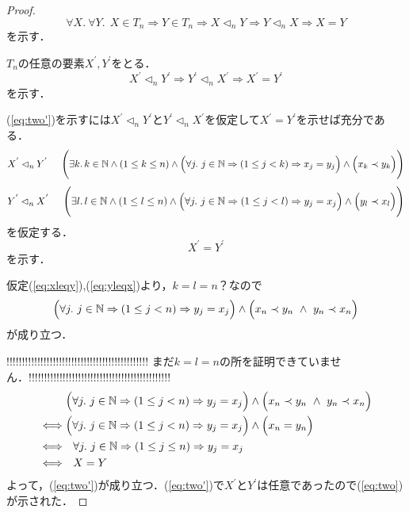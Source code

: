 \documentclass[11pt,dvipdfmx]{jarticle}
\theoremstyle{definition}
\begin{document}
\begin{proof}
\begin{equation}
\forall X. \ \forall Y. \ \ X \in T_{n} \Rightarrow Y \in T_{n} \Rightarrow X \lhd_{n} Y \Rightarrow Y \lhd_{n} X \Rightarrow X = Y
 \label{eq:two}
\end{equation}
を示す．\par
\noindent $T_{n}$の任意の要素$X^{'},Y^{'}$をとる．
\begin{equation}
X^{'} \lhd_{n} Y^{'} \Rightarrow Y^{'} \lhd_{n} X^{'} \Rightarrow X^{'} = Y^{'}
 \label{eq:two'}
\end{equation}
を示す．\par
\noindent (\ref{eq:two'})を示すには$X^{'} \lhd_{n} Y^{'}$と$Y^{'} \lhd_{n} X^{'}$を仮定して$X^{'} = Y^{'}$を示せば充分である．
\begin{equation}
 X^{'} \lhd_{n} Y^{'} \hspace{5mm} \Biggl( \exists k. \, k \in \mathbb{N} \land (1 \leq k \leq n) \land \Bigl( \forall j. \ j \in \mathbb{N} \Rightarrow (1 \leq j < k) \Rightarrow  x_{j} = y_{j} \Bigr) \land \Bigl( x_{k} \prec y_{k} \Bigr) \Biggr)
 \label{eq:xleqy}
\end{equation}
\begin{equation}
 Y^{'} \lhd_{n} X^{'} \hspace{5mm} \Biggl( \exists l. \, l \in \mathbb{N} \land (1 \leq l \leq n) \land \Bigl( \forall j. \ j \in \mathbb{N} \Rightarrow (1 \leq j < l) \Rightarrow  y_{j} = x_{j} \Bigr) \land \Bigl( y_{l} \prec x_{l} \Bigr) \Biggr)
 \label{eq:yleqx} 
\end{equation}
を仮定する．
\begin{equation}
 X^{'} = Y^{'}
\end{equation}
を示す． \par
\noindent 仮定(\ref{eq:xleqy}),(\ref{eq:yleqx})より，$k = l = n$？なので
\begin{equation}
\Bigl( \forall j. \ j \in \mathbb{N} \Rightarrow (1 \leq j < n) \Rightarrow  y_{j} = x_{j} \Bigr) \land \Bigl( x_{n} \prec y_{n} \ \land \ y_{n} \prec x_{n} \Bigr)
\end{equation}
が成り立つ．\par
\noindent !!!!!!!!!!!!!!!!!!!!!!!!!!!!!!!!!!!!!!!!!!!!!! まだ$k = l = n$の所を証明できていません．!!!!!!!!!!!!!!!!!!!!!!!!!!!!!!!!!!!!!!!!!!!!!! 
\begin{align*}
 & \Bigl( \forall j. \ j \in \mathbb{N} \Rightarrow (1 \leq j < n) \Rightarrow  y_{j} = x_{j} \Bigr) \land \Bigl( x_{n} \prec y_{n} \ \land \ y_{n} \prec x_{n} \Bigr) \\
\iff & \Bigl( \forall j. \ j \in \mathbb{N} \Rightarrow (1 \leq j < n) \Rightarrow  y_{j} = x_{j} \Bigr) \land \Bigl( x_{n} = y_{n} \Bigr) \\
\iff & \ \ \forall j. \ j \in \mathbb{N} \Rightarrow (1 \leq j \leq n) \Rightarrow  y_{j} = x_{j} \\
\iff & \ \ X = Y
\end{align*}
よって，(\ref{eq:two'})が成り立つ．(\ref{eq:two'})で$X^{'}$と$Y^{'}$は任意であったので(\ref{eq:two})が示された．
\end{proof}
\end{document}
